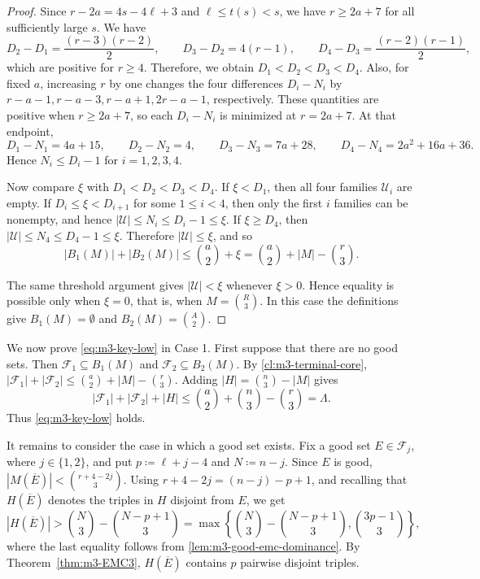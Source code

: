 \documentclass[10pt,a4paper]{article}
\numberwithin{equation}{section}
\theoremstyle{definition}
\newcommand{\F}{\mathcal F}
\begin{document}
\begin{proof}
    Since \(r-2a=4s-4\ell+3\) and \(\ell\le t(s)<s\), we have
    \(r\ge2a+7\) for all sufficiently large \(s\).
    We have
    \[
        D_2-D_1=\frac{(r-3)(r-2)}2,
        \qquad
        D_3-D_2=4(r-1),
        \qquad
        D_4-D_3=\frac{(r-2)(r-1)}2,
    \]
    which are positive for \(r\ge4\).
    Therefore, we obtain $D_1<D_2<D_3<D_4$.
    Also, for fixed \(a\), increasing
    \(r\) by one changes the four differences \(D_i-N_i\) by $r-a-1,r-a-3,r-a+1,2r-a-1$, respectively.
    These quantities are positive when \(r\ge2a+7\), so each
    \(D_i-N_i\) is minimized at \(r=2a+7\).  At that endpoint,
    \[
        D_1-N_1=4a+15,
        \qquad
        D_2-N_2=4,
        \qquad
        D_3-N_3=7a+28,
        \qquad
        D_4-N_4=2a^2+16a+36.
    \]
    Hence
    \(N_i\le D_i-1\) for \(i=1,2,3,4\).

    Now compare \(\xi\) with \(D_1<D_2<D_3<D_4\).  If \(\xi<D_1\), then
    all four families \(\mathcal U_i\) are empty.  If
    \(D_i\le\xi<D_{i+1}\) for some \(1\le i<4\), then only the first \(i\)
    families can be nonempty, and hence
    \(|\mathcal U|\le N_i\le D_i-1\le\xi.\)
    If \(\xi\ge D_4\), then
    \(|\mathcal U|\le N_4\le D_4-1\le\xi.\)
    Therefore \(|\mathcal U|\le\xi\), and so
    \[
        |B_1(M)|+|B_2(M)|
        \le
        \binom a2+\xi
        =
        \binom a2+|M|-\binom r3.
    \]

    The same threshold argument gives \(|\mathcal U|<\xi\) whenever
    \(\xi>0\).  Hence equality is possible only when \(\xi=0\), that is,
    when \(M=\binom R3\).  In this case the definitions give
    \(B_1(M)=\emptyset\) and \(B_2(M)=\binom A2\).
\end{proof}

We now prove \eqref{eq:m3-key-low} in Case 1.  First suppose that there are
no good sets.  Then
\(\F_1\subseteq B_1(M)\) and \(\F_2\subseteq B_2(M)\).
By \cref{cl:m3-terminal-core},
\(|\F_1|+|\F_2| \le \binom a2+|M|-\binom r3.\)
Adding \(|H|=\binom n3-|M|\) gives
\[
    |\F_1|+|\F_2|+|H|
    \le
    \binom a2+\binom n3-\binom r3
    =
    \Lambda.
\]
Thus \eqref{eq:m3-key-low} holds.

It remains to consider the case in which a good set exists.
Fix a good set \(E\in\F_j\), where \(j\in\{1,2\}\), and put
\(p\coloneqq \ell+j-4\) and \(N\coloneqq n-j\).
Since \(E\) is good,
\(|M(\overline E)|<\binom{r+4-2j}{3}.\)
Using \(r+4-2j=(n-j)-p+1\), and recalling that \(H(\overline E)\) denotes the triples in \(H\) disjoint from \(E\), we get
\begin{equation}\label{eq:m3-good-HbarE-lower}
    |H(\overline E)|
    >
    \binom N3-\binom{N-p+1}3 = \max\left\{\binom N3-\binom{N-p+1}3,\binom{{3p-1}}{3}\right\},
\end{equation}
where the last equality follows from \cref{lem:m3-good-emc-dominance}.
By Theorem~\ref{thm:m3-EMC3}, \(H(\overline E)\)
contains \(p\) pairwise disjoint triples.
\end{document}
